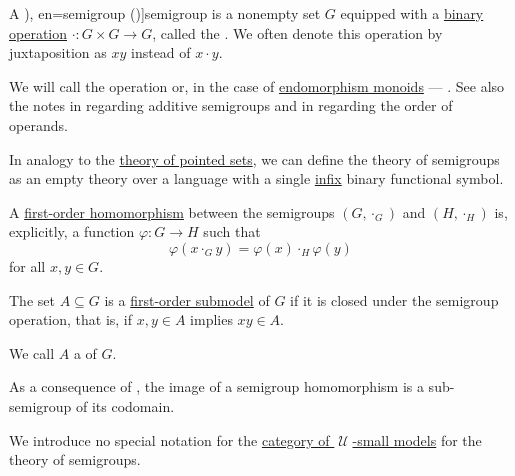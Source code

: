 \begin{definition}\label{def:semigroup}
  A \term[ru=полугруппа (\cite[28]{Ляпин1960Полугруппы}), en=semigroup (\cite[144]{MacLane1998Categories})]{semigroup} is a nonempty set \( G \) equipped with a \hyperref[def:operation_arity_terminology]{binary} \hyperref[def:operation_on_set]{operation} \( \cdot: G \times G \to G \), called the . We often denote this operation by juxtaposition as \( xy \) instead of \( x \cdot y \).

  We will call the operation  or, in the case of \hyperref[def:endomorphism_monoid]{endomorphism monoids} --- . See also the notes in  regarding additive semigroups and in  regarding the order of operands.

  \begin{thmenum}[series=def:semigroup]
    \mimprovised In analogy to the \hyperref[def:pointed_set/theory]{theory of pointed sets}, we can define the theory of semigroups as an empty theory over a language with a single \hyperref[rem:first_order_formula_conventions/infix]{infix} binary functional symbol.

     A \hyperref[def:first_order_homomorphism]{first-order homomorphism} between the semigroups \( (G, \cdot_{G}) \) and \( (H, \cdot_{H}) \) is, explicitly, a function \( \varphi: G \to H \) such that
    \begin{equation}\label{eq:def:semigroup/homomorphism}
      \varphi(x \cdot_{G} y) = \varphi(x) \cdot_{H} \varphi(y)
    \end{equation}
    for all \( x, y \in G \).

     The set \( A \subseteq G \) is a \hyperref[def:first_order_substructure]{first-order submodel} of \( G \) if it is closed under the semigroup operation, that is, if \( x, y \in A \) implies \( xy \in A \).

    We call \( A \) a  of \( G \).

    As a consequence of , the image of a semigroup homomorphism is a sub-semigroup of its codomain.

    \mimprovised We introduce no special notation for the \hyperref[def:category_of_small_first_order_models]{category of \( \mscrU \)-small models} for the theory of semigroups.


\end{thmenum}
\end{definition}
